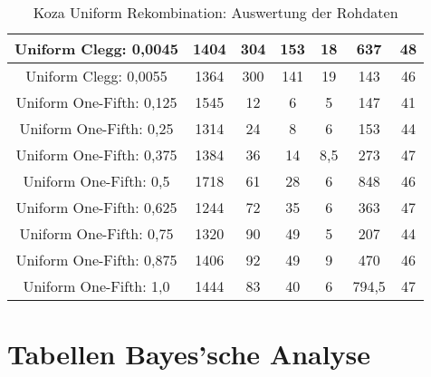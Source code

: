 \begin{table}[H]
\begin{tabular}{c | c | c | c | c | c | c}
		\hline
		Uniform Clegg: 0,0045 & 1404 & 304 & 153 & 18 & 637 & 48\\
		\hline
		Uniform Clegg: 0,0055 & 1364 & 300 & 141 & 19 & 143 & 46\\
		\hline
		\hline
		Uniform One-Fifth: 0,125 & 1545 & 12 & 6 & 5 & 147 & 41\\
		\hline
		Uniform One-Fifth: 0,25 & 1314 & 24 & 8 & 6 & 153 & 44\\
		\hline
		Uniform One-Fifth: 0,375 & 1384 & 36 & 14 & 8,5 & 273 & 47\\
		\hline
		Uniform One-Fifth: 0,5 & 1718 & 61 & 28 & 6 & 848 & 46\\
		\hline
		Uniform One-Fifth: 0,625 & 1244 & 72 & 35 & 6 & 363 & 47\\
		\hline
		Uniform One-Fifth: 0,75 & 1320 & 90 & 49 & 5 & 207 & 44\\
		\hline
		Uniform One-Fifth: 0,875 & 1406 & 92 & 49 & 9 & 470 & 46\\
		\hline
		Uniform One-Fifth: 1,0 & 1444 & 83 & 40 & 6 & 794,5 & 47\\
	\end{tabular}
	\caption{Koza Uniform Rekombination: Auswertung der Rohdaten}
	\label{table:kozaUniformRohdaten}
\end{table}
\section{Tabellen Bayes'sche Analyse}
\label{sec:appendixTabellenBayes}
